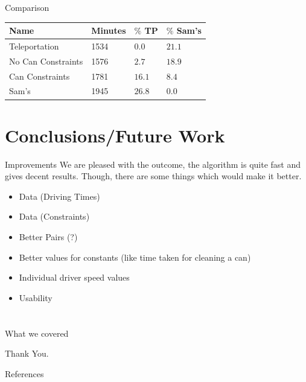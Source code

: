 \documentclass{beamer}
\begin{document}
\begin{frame}{Comparison}
	\begin{center}
	\begin{tabular}{llll}
		Name & Minutes & $\%$ TP & $\%$ Sam's\\
		\hline
		Teleportation & 1534 & $0.0$ & $21.1$ \\
		No Can Constraints & 1576 & $2.7$ & $18.9$ \\
		Can Constraints & 1781 & $16.1$ & $8.4$\\
		Sam's & 1945 & $26.8$ & $0.0$\\
	\end{tabular}
	\end{center}
\end{frame}

\section{Conclusions/Future Work} 
\begin{frame}{Improvements}
	We are pleased with the outcome, the algorithm is quite fast and gives decent results. Though, there are some things which would make it better.
	\begin{itemize}
		\item Data (Driving Times)
		\item Data (Constraints)
		\item Better Pairs (?)
    \item Better values for constants (like time taken for cleaning a can)
    \item Individual driver speed values
		\item Usability
	\end{itemize}
\end{frame}

\section*{}
\begin{frame}{What we covered}
\begin{multicols}{2}
	\tableofcontents
\end{multicols}
\end{frame}

\begin{frame}
\centering Thank You.
\end{frame}

\begin{frame}{References}

\end{frame}
\end{document}
